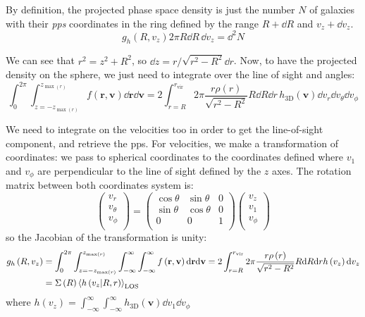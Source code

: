By definition, the projected phase space density is just the number $N$ of
galaxies with their \emph{pps} coordinates in the ring defined by the range
$R+\dd R$ and $v_z+\dd v_z$.
%
\begin{equation}
    g_h \left(R, v_z\right)2\pi R \dd R\, \dd v_z = \dd^2 N
\end{equation}

We can see that $r^2=z^2+R^2$, so $\dd{z}=r/\sqrt{r^2-R^2}\dd{r}$.
Now, to have the projected density on the sphere, we just need to integrate
over the line of sight and angles:
%
\begin{equation}
    \label{eq:intfunc}
    \int_0^{2\pi}\int_{z=-z_{\max\left(r\right)}}^{z_{\max\left(r\right)}}
    f\left(\textbf{r},\textbf{v}\right)\dd\textbf{r}
    \dd{\textbf{v}}=2\int_{r=R}^{r_{\mathrm{vir}}}2\pi
    \frac{r\rho\left(r\right)}{\sqrt{r^2-R^2}}R\dd R\dd r\,
    h_\mathrm{3D}\left(\textbf{v}\right)\dd v_r\dd v_\theta\dd v_\phi
\end{equation}

We need to integrate on the velocities too in order to get the line-of-sight
component, and retrieve the pps. For velocities, we make a transformation of
coordinates: we pass to spherical coordinates to the coordinates defined where
$v_1$ and $v_\phi$ are perpendicular to the line of sight defined by the $z$
axes. The rotation matrix between both coordinates system is:
%
\begin{equation}
    \begin{pmatrix}
        v_r \\
        v_\theta \\
        v_\phi \\
    \end{pmatrix}
    =
    \begin{pmatrix}
        \cos\theta & \sin\theta & 0 \\
        \sin\theta & \cos\theta & 0 \\
        0 & 0 & 1 \\
    \end{pmatrix}
    \begin{pmatrix}
        v_z \\
        v_1 \\
        v_\phi \\
    \end{pmatrix}
\end{equation}
%
so the Jacobian of the transformation is unity:
%
\begin{align}
    \label{eq:intintfunc}
    g_h \left(R, v_z\right) &=
    \int_0^{2\pi}\int_{z=-z_{\max\left(r\right)}}^{z_{\max\left(r\right)}}
    \int_{-\infty}^\infty\int_{-\infty}^\infty
    f\left(\textbf{r},\textbf{v}\right){\rm{d}}\textbf{r}{\rm{d}}\textbf{v}=
    2\int_{r=R}^{r_{\mathrm{vir}}}2\pi
    \frac{r\rho\left(r\right)}{\sqrt{r^2-R^2}}R{\rm{d}}{R}{\rm{d}}{r}
    h\left(v_z\right){\rm{d}}{v_z} \notag\\
    &= \Sigma \left(R\right) {\left< h \left(v_z|R, r\right)
    \right>}_\mathrm{LOS}
\end{align}
%
where $h \left(v_z\right) = \int_{-\infty}^\infty\int_{-\infty}^\infty
h_\mathrm{3D} \left(\textbf{v}\right)\dd v_1 \dd v_\phi$

